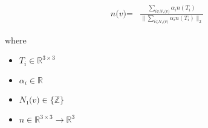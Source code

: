 \documentclass[12pt]{article}
\begin{document}
\begin{align*}
\textit{n(v)} = & \frac{\sum_{\textit{i} \in \textit{N₁(v)} } \textit{α}_{ \textit{i} }\textit{n}\left( \textit{T}_{ \textit{i} } \right)}{\|\sum_{\textit{i} \in \textit{N₁(v)} } \textit{α}_{ \textit{i} }\textit{n}\left( \textit{T}_{ \textit{i} } \right)\|_2}
\end{align*}

where
\begin{itemize}
\item $\textit{T}_{\textit{i}} \in \mathbb{R}^{ 3 \times 3 }$
\item $\textit{α}_{\textit{i}} \in \mathbb{{R}}$
\item $\textit{N₁(v)} \in \{\mathbb{Z}\}$
\item $\textit{n} \in \mathbb{R}^{ 3 \times 3 }\rightarrow \mathbb{R}^{ 3}$
\end{itemize}
\end{document}
